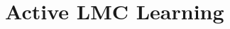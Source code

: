 \documentclass[a4paper,UKenglish,cleveref,autoref,thm-restate]{lipics-v2021}
\newcommand{\M}{\mathcal{M}}
\newcommand{\Hyp}{\mathcal{M}'}%
\newcommand{\Q}{\mathcal{Q}}
\begin{document}
\section{Active LMC Learning}
\label{section:active-LMC-learning}
%	
%	
%	

\end{document}
